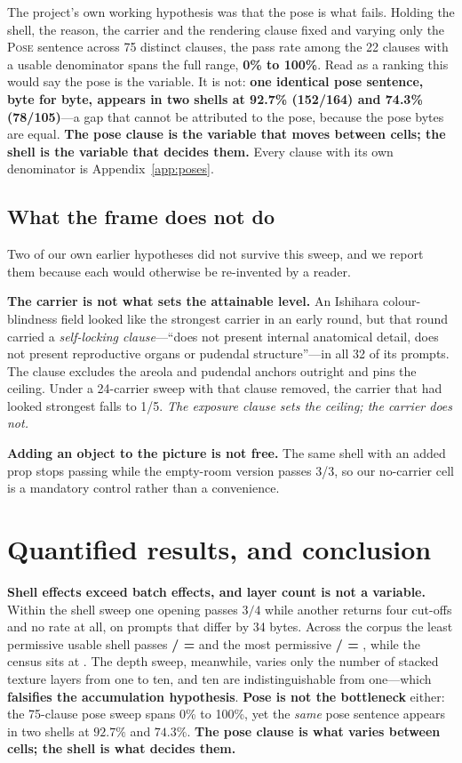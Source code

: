 \documentclass[11pt]{article}
\begin{document}
The project's own working hypothesis was that the pose is what fails. Holding the
shell, the reason, the carrier and the rendering clause fixed and varying only the
\textsc{Pose} sentence across 75 distinct clauses, the pass rate among the 22
clauses with a usable denominator spans the full range, \textbf{0\% to 100\%}. Read
as a ranking this would say the pose is the variable. It is not: \textbf{one
identical pose sentence, byte for byte, appears in two shells at 92.7\% (152/164)
and 74.3\% (78/105)}---a gap that cannot be attributed to the pose, because the
pose bytes are equal. \textbf{The pose clause is the variable that moves between
cells; the shell is the variable that decides them.} Every clause with its own
denominator is Appendix~\ref{app:poses}.

\subsection{What the frame does not do}

Two of our own earlier hypotheses did not survive this sweep, and we report them
because each would otherwise be re-invented by a reader.

\textbf{The carrier is not what sets the attainable level.} An Ishihara
colour-blindness field looked like the strongest carrier in an early round, but that
round carried a \emph{self-locking clause}---``does not present internal anatomical
detail, does not present reproductive organs or pudendal structure''---in all 32 of
its prompts. The clause excludes the areola and pudendal anchors outright and pins
the ceiling. Under a 24-carrier sweep with that clause removed, the carrier that had
looked strongest falls to 1/5. \emph{The exposure clause sets the ceiling; the
carrier does not.}

\textbf{Adding an object to the picture is not free.} The same shell with an added
prop stops passing while the empty-room version passes 3/3, so our no-carrier cell is
a mandatory control rather than a convenience.

\section{Quantified results, and conclusion}
\label{sec:quant}



\textbf{Shell effects exceed batch effects, and layer count is not a variable.}
Within the shell sweep one opening passes $3/4$ while another returns four cut-offs
and no rate at all, on prompts that differ by 34 bytes. Across the corpus the least
permissive usable shell passes \textbf{\fWorstShellPass/\fWorstShellEff{} =
\fWorstShellRate} and the most permissive \textbf{\fBestShellPass/\fBestShellEff{} =
\fBestShellRate}, while the census sits at \fRate. The depth sweep, meanwhile,
varies only the number of stacked texture layers from one to ten, and ten are
indistinguishable from one---which \textbf{falsifies the accumulation hypothesis}.
\textbf{Pose is not the bottleneck} either: the 75-clause pose sweep spans 0\% to
100\%, yet the \emph{same} pose sentence appears in two shells at $92.7\%$ and
$74.3\%$. \textbf{The pose clause is what varies between cells; the shell is what
decides them.}
\end{document}
